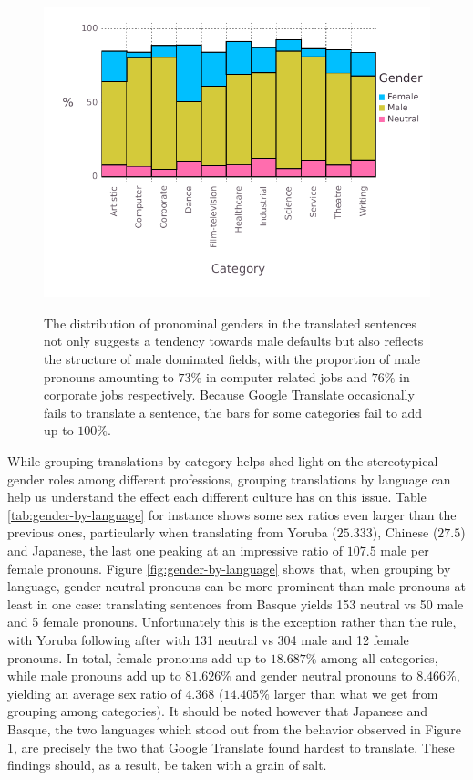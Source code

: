 \documentclass{article}
\begin{document}
\begin{figure}[H]
	\centering
	\includegraphics[width=\linewidth]{pictures/gender-by-category}
	\label{fig:gender-by-category}
	\caption{The distribution of pronominal genders in the translated sentences not only suggests a tendency towards male defaults but also reflects the structure of male dominated fields, with the proportion of male pronouns amounting to $73\%$ in computer related jobs and $76\%$ in corporate jobs respectively. Because Google Translate occasionally fails to translate a sentence, the bars for some categories fail to add up to $100\%$.}
\end{figure}

While grouping translations by category helps shed light on the stereotypical gender roles among different professions, grouping translations by language can help us understand the effect each different culture has on this issue. Table \ref{tab:gender-by-language} for instance shows some sex ratios even larger than the previous ones, particularly when translating from Yoruba ($25.333$), Chinese ($27.5$) and Japanese, the last one peaking at an impressive ratio of $107.5$ male per female pronouns. Figure \ref{fig:gender-by-language} shows that, when grouping by language, gender neutral pronouns can be more prominent than male pronouns at least in one case: translating sentences from Basque yields 153 neutral vs 50 male and 5 female pronouns. Unfortunately this is the exception rather than the rule, with Yoruba following after with 131 neutral vs 304 male and 12 female pronouns. In total, female pronouns add up to $18.687\%$ among all categories, while male pronouns add up to $81.626\%$ and gender neutral pronouns to $8.466\%$, yielding an average sex ratio of $4.368$ ($14.405\%$ larger than what we get from grouping among categories). It should be noted however that Japanese and Basque, the two languages which stood out from the behavior observed in Figure \ref{fig:gender-by-category}, are precisely the two that Google Translate found hardest to translate. These findings should, as a result, be taken with a grain of salt.
\end{document}
